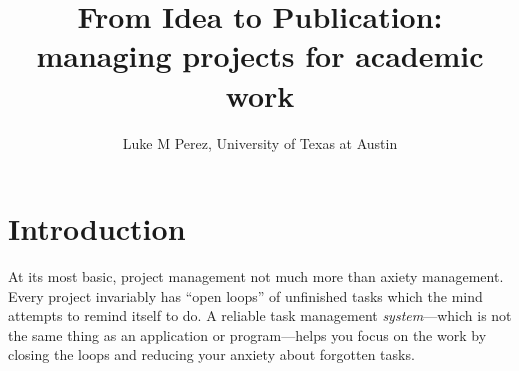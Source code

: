 \documentclass{tufte-handout}
\title{From Idea to Publication: managing projects for academic work}
\author[lmp]{Luke M Perez, University of Texas at Austin}
\begin{document}
\maketitle%



\section{Introduction} %
\label{sec:intro}

At its most basic, project management not much more than axiety management. Every project invariably has ``open loops'' of unfinished tasks which the mind attempts to remind itself to do. A reliable task management \textit{system}---which is not the same thing as an application or program---helps you focus on the work by closing the loops and reducing your anxiety about forgotten tasks.



\end{document}
